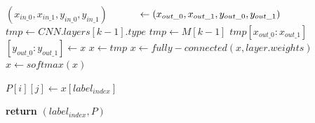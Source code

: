 \begin{algorithm}
\begin{algorithmic}[1]
            \State $(x_{in\_0}, x_{in\_1}, y_{in\_0}, y_{in\_1})$
            \State $\hspace{10mm} \gets (x_{out\_0}, x_{out\_1}, y_{out\_0}, y_{out\_1})$
            \State $tmp \gets CNN.layers[k-1].type$
              \State $tmp \gets M[k-1]$
              \State $tmp[x_{out\_0}:x_{out\_1}]$$[y_{out\_0}:y_{out\_1}]$$\gets x$
              \State $x \gets tmp$
            \EndIf
            \State $x \gets fully-connected(x, layer.weights)$
            \State $x \gets softmax(x)$
          \EndIf
      \EndFor

      \State $P[i][j] \gets x[label_{index}]$
      
  \EndFor
\EndFor

\State \textbf{return} $(label_{index}, P)$
\EndProcedure
\end{algorithmic}
\end{algorithm}